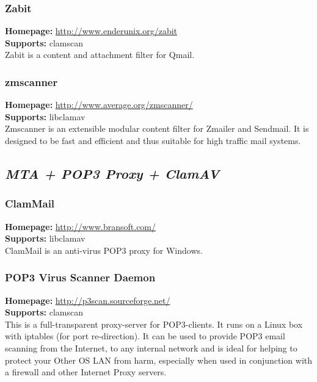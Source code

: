 \documentclass[a4paper,titlepage,12pt]{article}
\begin{document}
    \subsubsection{Zabit}
    \textbf{Homepage:} \url{http://www.enderunix.org/zabit}\\
    \textbf{Supports:} clamscan\\[4pt]
    Zabit is a content and attachment filter for Qmail.

    \subsubsection{zmscanner}
    \textbf{Homepage:} \url{http://www.average.org/zmscanner/}\\
    \textbf{Supports:} libclamav\\[4pt]
    Zmscanner is an extensible modular content filter for Zmailer and Sendmail.
    It is designed to be fast and efficient and thus suitable for high traffic
    mail systems.

    \subsection{\emph{MTA + POP3 Proxy + ClamAV}}

    \subsubsection{ClamMail}
    \textbf{Homepage:} \url{http://www.bransoft.com/}\\
    \textbf{Supports:} libclamav\\[4pt]
    ClamMail is an anti-virus POP3 proxy for Windows.

    \subsubsection{POP3 Virus Scanner Daemon}
    \textbf{Homepage:} \url{http://p3scan.sourceforge.net/}\\
    \textbf{Supports:} clamscan\\[4pt]
    This is a full-transparent proxy-server for POP3-clients. It runs on
    a Linux box with iptables (for port re-direction). It can be used to
    provide POP3 email scanning from the Internet, to any internal network
    and is ideal for helping to protect your Other OS LAN from harm,
    especially when used in conjunction with a firewall and other Internet
    Proxy servers.
\end{document}
